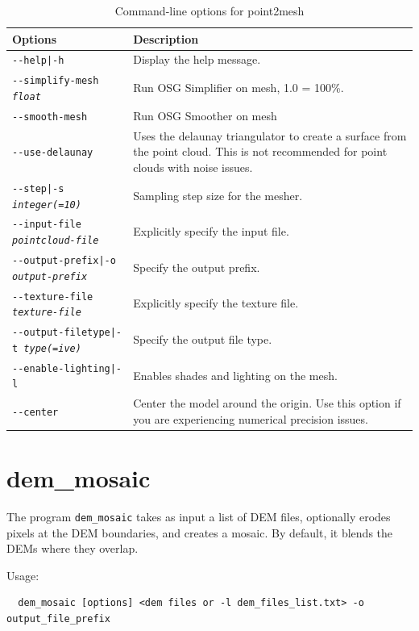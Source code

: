 \begin{longtable}{|l|p{10cm}|}
\caption{Command-line options for point2mesh}
\label{tbl:point2mesh}
\endfirsthead
\endhead
\endfoot
\endlastfoot
\hline
Options & Description \\ \hline \hline
\texttt{-\/-help|-h} & Display the help message.\\ \hline
\texttt{-\/-simplify-mesh \textit{float}} & Run OSG Simplifier on mesh, 1.0 = 100\%. \\ \hline
\texttt{-\/-smooth-mesh} & Run OSG Smoother on mesh \\ \hline
\texttt{-\/-use-delaunay} & Uses the delaunay triangulator to create a surface from the point cloud. This is not recommended for point clouds with noise issues. \\ \hline
\texttt{-\/-step|-s \textit{integer(=10)}} & Sampling step size for the mesher. \\ \hline
\texttt{-\/-input-file \textit{pointcloud-file}} & Explicitly specify the input file. \\ \hline
\texttt{-\/-output-prefix|-o \textit{output-prefix}} & Specify the output prefix. \\ \hline
\texttt{-\/-texture-file \textit{texture-file}} & Explicitly specify the texture file. \\ \hline
\texttt{-\/-output-filetype|-t \textit{type(=ive)}} & Specify the output file type. \\ \hline
\texttt{-\/-enable-lighting|-l} & Enables shades and lighting on the mesh. \\ \hline
\texttt{-\/-center} & Center the model around the origin. Use this option if you are experiencing numerical precision issues. \\ \hline
\end{longtable}

\clearpage

\section{dem\_mosaic}
\label{demmosaic}

The program \texttt{dem\_mosaic} takes as input a list of \ac{DEM} files,
optionally erodes pixels at the \ac{DEM} boundaries, and creates a mosaic.
By default, it blends the DEMs where they overlap.

Usage:
\begin{verbatim}
  dem_mosaic [options] <dem files or -l dem_files_list.txt> -o output_file_prefix
\end{verbatim}

